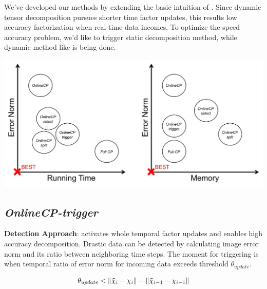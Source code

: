 
We've developed our methods by extending the basic intuition of \ocp. Since dynamic tensor decomposition pursues shorter time factor updates, this results low accuracy factorization when real-time data incomes. To optimize the speed accuracy problem, we'd like to trigger static decomposition method, \cpals while dynamic method like \ocp is being done.

\begin{center}
	\includegraphics[width=1\textwidth]{FIG/Method-optimization.pdf}
\end{center}

\newpage
\subsection{\em OnlineCP-trigger}
\textbf{Detection Approach}: \cpals activates whole temporal factor updates and enables high accuracy decomposition. Drastic data can be detected by calculating image error norm and its ratio between neighboring time steps. The moment for triggering \cpals is when temporal ratio of error norm for incoming data exceeds threshold ${\theta}_{update}$.

\begin{align*}
    {\theta}_{update} < \left\lVert\tilde{\chi}_{i}-\chi_{i}\right\rVert-\left\lVert\tilde{\chi}_{i-1}-\chi_{i-1}\right\rVert 
\end{align*}

